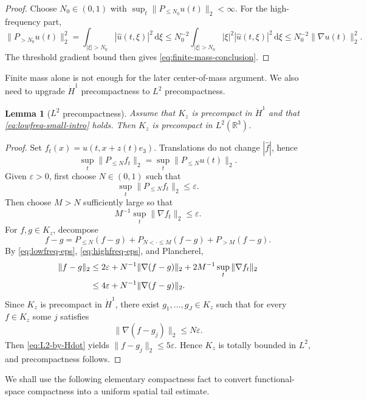\documentclass[preprint,12pt]{elsarticle}
\numberwithin{equation}{section}
\newcommand{\R}{\mathbb R}
\newcommand{\dd}{\,\mathrm d}
\newcommand{\eps}{\varepsilon}
\newcommand{\na}{\nabla}
\newcommand{\ez}{e_3}
\newtheorem{lemma}[theorem]{Lemma}
\theoremstyle{remark}
\begin{document}
\begin{proof}
Choose $N_0\in(0,1)$ with $\sup_t\|P_{\le N_0}u(t)\|_2<\infty$.  For the high-frequency part,
\[
  \|P_{>N_0}u(t)\|_2^2
  =\int_{|\xi|>N_0}|\widehat u(t,\xi)|^2\dd\xi
  \le N_0^{-2}\int_{|\xi|>N_0}|\xi|^2|\widehat u(t,\xi)|^2\dd\xi
  \le N_0^{-2}\|\na u(t)\|_2^2.
\]
The threshold gradient bound then gives \eqref{eq:finite-mass-conclusion}.
\end{proof}

Finite mass alone is not enough for the later center-of-mass argument.  We also need to upgrade $\dot H^1$ precompactness to $L^2$ precompactness.

\begin{lemma}[$L^2$ precompactness]\label{lem:lowfreq-L2-precompact}
Assume that $K_z$ is precompact in $\dot H^1$ and that \eqref{eq:lowfreq-small-intro} holds.  Then $K_z$ is precompact in $L^2(\R^3)$.
\end{lemma}

\begin{proof}
Set $f_t(x)=u(t,x+z(t)\ez)$.  Translations do not change $|\widehat f|$, hence
\[
  \sup_t\|P_{\le N}f_t\|_2=\sup_t\|P_{\le N}u(t)\|_2.
\]
Given $\eps>0$, first choose $N\in(0,1)$ such that
\begin{equation}\label{eq:lowfreq-eps}
  \sup_t\|P_{\le N}f_t\|_2\le\eps.
\end{equation}
Then choose $M>N$ sufficiently large so that
\begin{equation}\label{eq:highfreq-eps}
  M^{-1}\sup_t\|\na f_t\|_2\le\eps.
\end{equation}
For $f,g\in K_z$, decompose
\[
  f-g=P_{\le N}(f-g)+P_{N<\cdot\le M}(f-g)+P_{>M}(f-g).
\]
By \eqref{eq:lowfreq-eps}, \eqref{eq:highfreq-eps}, and Plancherel,
\begin{align}
  \|f-g\|_2
  &\le 2\eps+N^{-1}\|\na(f-g)\|_2+2M^{-1}\sup_t\|\na f_t\|_2 \notag\\
  &\le 4\eps+N^{-1}\|\na(f-g)\|_2.\label{eq:L2-by-Hdot}
\end{align}
Since $K_z$ is precompact in $\dot H^1$, there exist $g_1,\dots,g_J\in K_z$ such that for every $f\in K_z$ some $j$ satisfies
\[
  \|\na(f-g_j)\|_2\le N\eps.
\]
Then \eqref{eq:L2-by-Hdot} yields $\|f-g_j\|_2\le5\eps$.  Hence $K_z$ is totally bounded in $L^2$, and precompactness follows.
\end{proof}

We shall use the following elementary compactness fact to convert functional-space compactness into a uniform spatial tail estimate.
\end{document}

